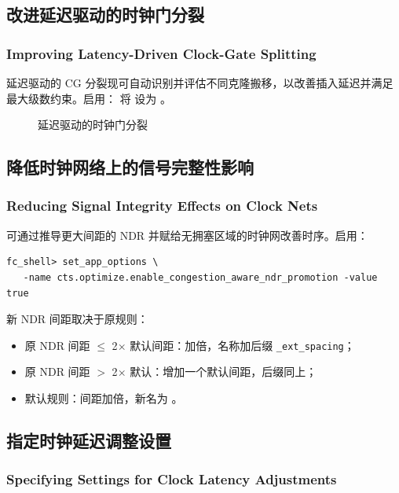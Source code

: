 \subsection{改进延迟驱动的时钟门分裂}
\subsubsection*{Improving Latency-Driven Clock-Gate Splitting}

延迟驱动的 CG 分裂现可自动识别并评估不同克隆搬移，以改善插入延迟并满足最大级数约束。启用：
将  设为 。

\begin{figure}[htbp]
\centering
{}
\caption{延迟驱动的时钟门分裂}
\label{fig:cts-cg-split}
\end{figure}

\subsection{降低时钟网络上的信号完整性影响}
\subsubsection*{Reducing Signal Integrity Effects on Clock Nets}

可通过推导更大间距的 NDR 并赋给无拥塞区域的时钟网改善时序。启用：
\begin{lstlisting}
fc_shell> set_app_options \
   -name cts.optimize.enable_congestion_aware_ndr_promotion -value true
\end{lstlisting}
新 NDR 间距取决于原规则：
\begin{itemize}
  \item 原 NDR 间距 $\leq$ 2$\times$ 默认间距：加倍，名称加后缀 \texttt{\_ext\_spacing}；
  \item 原 NDR 间距 $>$ 2$\times$ 默认：增加一个默认间距，后缀同上；
  \item 默认规则：间距加倍，新名为 。
\end{itemize}

\subsection{指定时钟延迟调整设置}
\subsubsection*{Specifying Settings for Clock Latency Adjustments}

